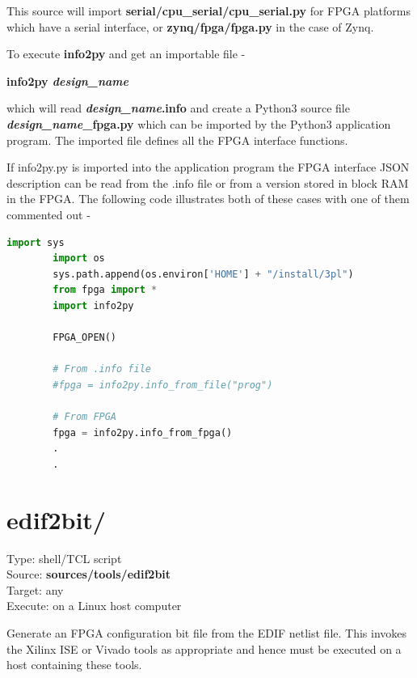         This source will import {\bf serial/cpu\_serial/cpu\_serial.py}
        for FPGA platforms which have a serial interface, or
        {\bf zynq/fpga/fpga.py} in the case of Zynq.

        To execute {\bf info2py} and get an importable file -
        
        {\bf info2py {\em design\_name}}
        
        which will read {\bf {\em design\_name}.info} and create a Python3
        source file {\bf {\em design\_name}\_fpga.py} which can be imported by the
        Python3 application program. The imported file defines all the FPGA
        interface functions.
        
        If info2py.py is imported into the application program the FPGA interface
        JSON description can be read from the .info file or from a version stored
        in block RAM in the FPGA. The following code illustrates both of these
        cases with one of them commented out -
        
        \begin{lstlisting}[gobble=4, language=Python]
        import sys
        import os
        sys.path.append(os.environ['HOME'] + "/install/3pl")
        from fpga import *
        import info2py

        FPGA_OPEN()

        # From .info file
        #fpga = info2py.info_from_file("prog")
        
        # From FPGA
        fpga = info2py.info_from_fpga()
        .
        .
        \end{lstlisting}






    \section{edif2bit/}
        
        Type: shell/TCL script\\        
        Source: {\bf sources/tools/edif2bit}\\
        Target: any\\        
        Execute: on a Linux host computer
        
        Generate an FPGA configuration bit file
        from the EDIF netlist file. This invokes the Xilinx ISE or
        Vivado tools as appropriate and hence must be executed on a host
        containing these tools.
        
